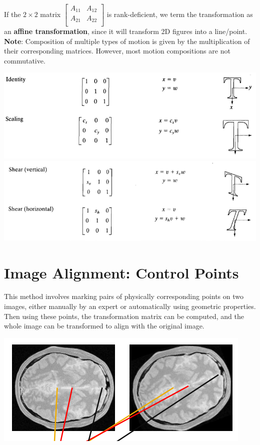\documentclass{report}
\begin{document}
If the $2\times 2$ matrix $\begin{bmatrix}
    A_{11} & A_{12} \\
    A_{21} & A_{22} \\
  \end{bmatrix}$ is rank-deficient, we term the transformation as an \textbf{affine transformation}, since it will transform 2D figures into a line/point. \\

\textbf{Note}: Composition of multiple types of motion is given by the multiplication of their corresponding matrices. However, most motion compositions are not commutative.

\begin{center}
  \includegraphics[scale=0.8]{"images/02.png"}
  \includegraphics[scale=0.9]{"images/03.png"}
\end{center}

\section{Image Alignment: Control Points}

This method involves marking pairs of physically corresponding points on two images, either manually by an expert or automatically using geometric properties. Then using these points, the transformation matrix can be computed, and the whole image can be transformed to align with the original image.

\begin{center}
  \includegraphics[scale=1]{"images/04.png"}
\end{center}
\end{document}
